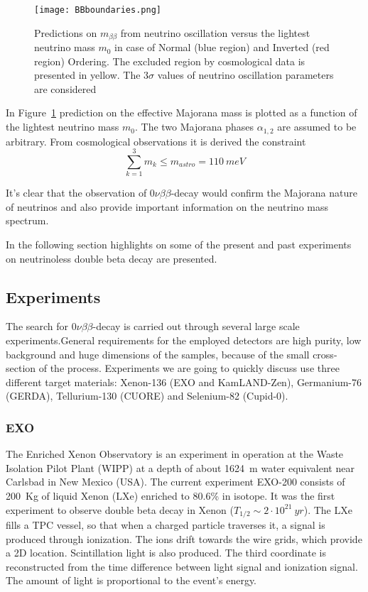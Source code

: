 \documentclass{subnucbo}
\begin{document}
\begin{figure}[h]
\centering
\texttt{[image: BBboundaries.png]}
\caption{Predictions on $m_{\beta\beta}$ from neutrino oscillation versus the lightest neutrino mass $m_0$ in case of Normal (blue region) and Inverted (red region) Ordering. The excluded region by cosmological data is presented in yellow. The $3\sigma$ values of neutrino oscillation parameters are considered }%
\label{fig:BBbound}
\end{figure}%
In Figure~\ref{fig:BBbound} prediction on the effective Majorana mass is plotted as a function of the lightest neutrino mass $m_0$. The two Majorana phases $\alpha_{1,2}$ are assumed to be arbitrary. From cosmological observations %
 it is derived the constraint 
\begin{equation}
\sum_{k=1}^3m_k\leq m_{astro}=\SI{110}{meV}
\end{equation}

It's clear that the observation of $0\nu\beta\beta$-decay would confirm the Majorana nature of neutrinos and also provide important  information on the neutrino mass spectrum.

In the following section highlights on some of the present and past experiments on neutrinoless double beta decay are presented.

\subsection{Experiments}
The search for $0\nu\beta\beta$-decay is carried out through several large scale experiments.General requirements for the employed detectors are high purity, low background and huge dimensions of the samples, because of the small cross-section of the process.
Experiments we are going to quickly discuss use three different target materials: Xenon-136 (EXO and KamLAND-Zen), Germanium-76 (GERDA), Tellurium-130 (CUORE) and Selenium-82 (Cupid-0).

\subsubsection{EXO}
The Enriched Xenon Observatory is an experiment in operation at the Waste Isolation Pilot Plant (WIPP) at a depth of about \SI{1624}{m} water equivalent near Carlsbad in New Mexico (USA).
The current experiment EXO-200 consists of \SI{200}{Kg} of liquid Xenon (LXe) enriched to 80.6\% in  isotope.  It was the first experiment to observe double beta decay in Xenon ($T_{1/2}\sim 2\cdot10^{21}\SI{}{yr}$).
The LXe fills a TPC vessel, so that when a charged particle traverses it, a signal is produced through ionization. The ions drift towards the wire grids, which provide a 2D location. Scintillation light is also produced. The third coordinate is reconstructed from the time difference between light signal and ionization signal. The amount of light is proportional to the event's energy.
\end{document}
